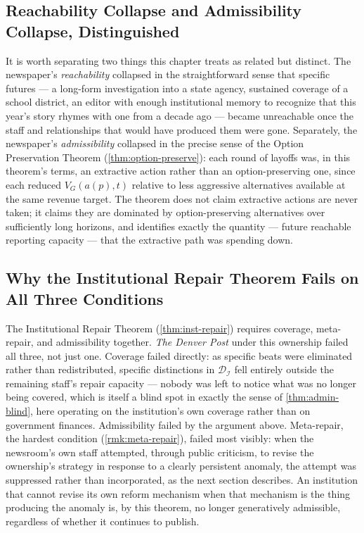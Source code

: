 \documentclass[12pt,twoside,openright]{book}
\begin{document}
\subsection{Reachability Collapse and Admissibility Collapse,
Distinguished}

It is worth separating two things this chapter treats as
related but distinct. The newspaper's \emph{reachability}
collapsed in the straightforward sense that specific futures ---
a long-form investigation into a state agency, sustained
coverage of a school district, an editor with enough institutional
memory to recognize that this year's story rhymes with one from
a decade ago --- became unreachable once the staff and
relationships that would have produced them were gone.
Separately, the newspaper's \emph{admissibility} collapsed in the
precise sense of the Option Preservation Theorem
(\cref{thm:option-preserve}): each round of layoffs was, in this
theorem's terms, an extractive action rather than an
option-preserving one, since each reduced $V_G(a(p), t)$ relative
to less aggressive alternatives available at the same
revenue target. The theorem does not claim extractive actions
are never taken; it claims they are dominated by option-preserving
alternatives over sufficiently long horizons, and identifies
exactly the quantity --- future reachable reporting capacity ---
that the extractive path was spending down.

\subsection{Why the Institutional Repair Theorem Fails on All Three Conditions}

The Institutional Repair Theorem (\cref{thm:inst-repair})
requires coverage, meta-repair, and admissibility together.
\emph{The Denver Post} under this ownership failed all three, not
just one. Coverage failed directly: as specific beats were
eliminated rather than redistributed, specific distinctions in
$\mathcal{D}_\mathcal{I}$ fell entirely outside the remaining
staff's repair capacity --- nobody was left to notice what was no
longer being covered, which is itself a blind spot in exactly the
sense of \cref{thm:admin-blind}, here operating on the
institution's own coverage rather than on government finances.
Admissibility failed by the argument above. Meta-repair, the
hardest condition (\cref{rmk:meta-repair}), failed most visibly: when
the newsroom's own staff attempted, through public criticism, to
revise the ownership's strategy in response to a clearly
persistent anomaly, the attempt was suppressed rather than
incorporated, as the next section describes. An institution that
cannot revise its own reform mechanism when that mechanism is
the thing producing the anomaly is, by this theorem, no longer
generatively admissible, regardless of whether it continues to
publish.
\end{document}
